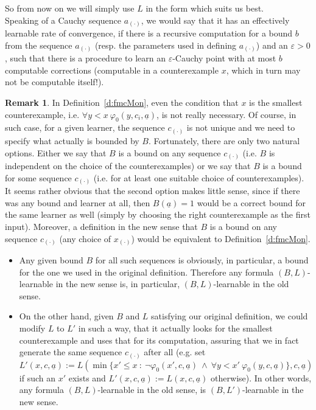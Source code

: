 \documentclass[1p]{elsarticle}
\newcommand{\tup}{\underline} %
\theoremstyle{plain}
\theoremstyle{definition}
\newtheorem{rmk}[thm]{Remark}
\theoremstyle{remark}
\renewcommand{\phi}{\varphi}
\renewcommand{\epsilon}{\varepsilon}
\theoremstyle{definition}
\begin{document}
So from now on we will simply use $L$ in the form which suits us best.
\\[2mm] 
Speaking of a Cauchy sequence $a_{(\cdot)}$, we would say that it has an effectively learnable rate of convergence, if there is a recursive 
computation for a bound $b$ from the sequence $a_{(\cdot)}$ (resp. the 
parameters used in defining $a_{(\cdot)}$) and an  
$\epsilon >0$, such that there is a procedure to learn 
an $\epsilon$-Cauchy point with at most $b$ computable corrections (computable in a counterexample $x$, which in turn may not be computable itself!).
\begin{rmk}\label{r:smallestCE}
In Definition~\ref{d:fmcMon}, even the condition that $x$ is the smallest counterexample, i.e. $\forall y<x\ \phi_0(y,c_i,\tup a)$, 
is not really necessary. Of course, in such
case, for a given learner, the sequence $c_{(\cdot)}$ is not unique and we need to specify what actually is bounded by $B$. Fortunately, there are only two natural options.
 Either we say that $B$ is a bound on any sequence $c_{(\cdot)}$ (i.e. $B$ is independent on
the choice of the counterexamples) or we say that $B$ is a bound for some sequence $c_{(\cdot)}$ (i.e. for at least one suitable choice of counterexamples). 
It seems rather obvious that the second option makes little sense, since if there was any bound and learner at all, 
then $B(\tup a)=1$ would be a correct bound for the same learner as well (simply by choosing the right counterexample as the first input).
Moreover, a definition in the new sense that $B$ is a bound on any sequence $c_{(\cdot)}$ (any choice of $x_{(\cdot)}$) would be equivalent to Definition~\ref{d:fmcMon}.
\begin{itemize} 
\item Any given bound $B$ for all such sequences is obviously, in particular, a bound for the one we used in the original definition. 
Therefore any formula $(B,L)$-learnable in the new sense is, in particular, $(B,L)$-learnable in the old sense.
\item On the other hand, given $B$ and $L$ satisfying our original definition, we could modify $L$ to $L'$ in such a way, that it actually looks for the smallest counterexample and uses that for its computation, assuring that we in fact generate the same sequence $c_{(\cdot)}$ after all (e.g. set 
$L'(x,c,\tup a):=L(\min \{x'\leq x\ :\  \neg\phi_0(x',c,\tup a)\ \wedge\ \forall y<x'\ \phi_0(y,c,\tup a)\},c,\tup a)$ if such an $x'$ exists and 
$L'(x,c,\tup a):=L(x,c,\tup a)$ otherwise). In other words, any formula $(B,L)$-learnable in the old sense, is $(B,L')$-learnable in the new sense.
\end{itemize}
\end{rmk}
\end{document}
